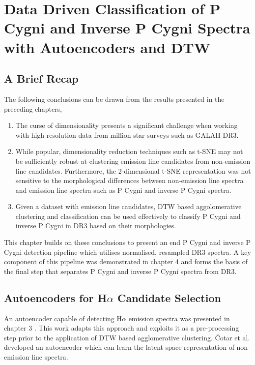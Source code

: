\chapter{Data Driven Classification of P Cygni and
Inverse P Cygni Spectra with Autoencoders and DTW}

\section{A Brief Recap}

The following conclusions can be drawn from the results presented in the preceding chapters,

\begin{enumerate}
    \item The curse of dimensionality presents a significant challenge when working with high resolution data from million star surveys such as GALAH DR3. 
    \item While popular,  dimensionality reduction techniques such as t-SNE may not be sufficiently robust at clustering emission line candidates from non-emission line candidates. Furthermore, the 2-dimensional t-SNE representation was not sensitive to the morphological differences between non-emission line spectra and emission line spectra such as P Cygni and inverse P Cygni spectra.
    \item Given a dataset with emission line candidates, DTW based aggolomerative clustering and classification can be used effectively to classify P Cygni and inverse P Cygni in DR3 based on their morphologies.
\end{enumerate}

This chapter builds on these conclusions to present an end P Cygni and inverse P Cygni detection pipeline which utilises normalised, resampled DR3 spectra. A key component of this pipeline was demonstrated in chapter 4 and forms the basis of the final step that separates P Cygni and inverse P Cygni spectra from DR3. 

\section{Autoencoders for H$\alpha$ Candidate Selection}

An autoencoder capable of detecting H$\alpha$ emission spectra was presented in chapter 3 \cite{vcotar2021galah}. This work adapts this approach and exploits it as a pre-processing step prior to the application of DTW based agglomerative clustering. Čotar et al. developed an autoencoder which can learn the latent space representation of non-emission line spectra. 

